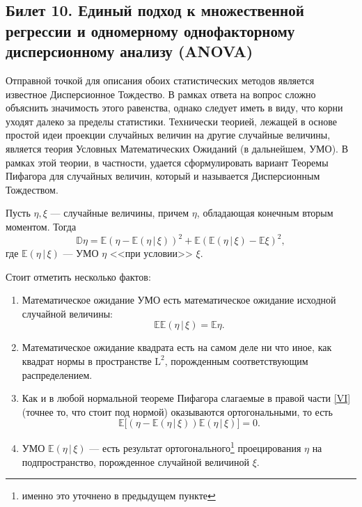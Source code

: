 \subsection{ Билет 10. Единый подход к множественной регрессии и одномерному однофакторному дисперсионному анализу (ANOVA) }

Отправной точкой для описания обоих статистических методов является известное Дисперсионное Тождество.
В рамках ответа на вопрос сложно объяснить значимость этого равенства, однако следует иметь в виду, что корни уходят далеко за пределы статистики.
Технически теорией, лежащей в основе простой идеи проекции случайных величин на другие случайные величины, является теория Условных Математических Ожиданий (в дальнейшем, УМО).
В рамках этой теории, в частности, удается сформулировать вариант Теоремы Пифагора для случайных величин, который и называется Дисперсионным Тождеством.

\begin{thm}
    Пусть $\eta, \xi$ --- случайные величины, причем $\eta$, обладающая конечным вторым моментом.
    Тогда
    \begin{equation}
        \label{VI}
        \mathbb D \eta = \mathbb E(\eta - \mathbb E(\eta\, | \, \xi))^2 + \mathbb E(\mathbb E(\eta\, | \, \xi) - \mathbb E \xi)^2,
    \end{equation}
    где $\mathbb E(\eta \,|\, \xi)$ --- УМО $\eta$ <<при условии>> $\xi$.
\end{thm}

{ \footnotesize
Стоит отметить несколько фактов:
\begin{enumerate}
    \item Математическое ожидание УМО есть математическое ожидание исходной случайной величины:
        \begin{equation}
            \mathbb E \mathbb E(\eta \, | \, \xi) = \mathbb E \eta.
        \end{equation}
    \item Математическое ожидание квадрата есть на самом деле ни что иное, как квадрат нормы в пространстве $\mathrm L^2$, порожденным соответствующим распределением.
    \item Как и в любой нормальной теореме Пифагора слагаемые в правой части \eqref{VI} (точнее то, что стоит под нормой) оказываются ортогональными, то есть
        \begin{equation}
            \mathbb E [ (\eta - \mathbb E(\eta\, | \, \xi)) \mathbb E(\eta\, | \, \xi) \big ] = 0.
        \end{equation}
    \item УМО $\mathbb E(\eta \, | \, \xi)$ --- есть результат ортогонального\footnote{именно это уточнено в предыдущем пункте} проецирования
        $\eta$ на подпространство, порожденное случайной величиной $\xi$.
\end{enumerate}
}

